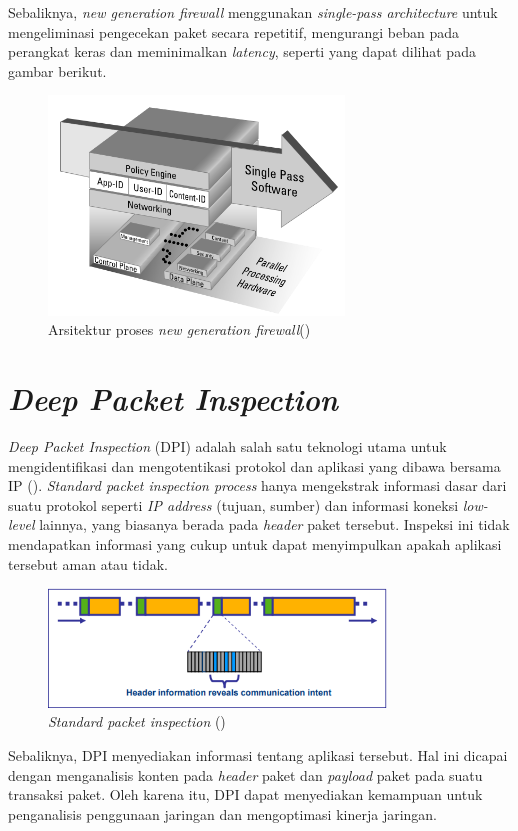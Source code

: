 Sebaliknya, \textit{new generation firewall} menggunakan \textit{single-pass architecture} untuk mengeliminasi pengecekan paket secara repetitif, mengurangi beban pada perangkat keras dan meminimalkan \textit{latency}, seperti yang dapat dilihat pada gambar berikut.

\begin{figure}[H]
	\centering
	\includegraphics[width=0.7\textwidth]{resources/architecture_NGFW.png}
	\caption{Arsitektur proses \textit{new generation firewall}(\cite{miller2011next})}
	\label{fig:architecture_NGFW}
\end{figure}

\section{\textit{Deep Packet Inspection}}
\textit{Deep Packet Inspection} (DPI) adalah salah satu teknologi utama untuk mengidentifikasi dan mengotentikasi protokol dan aplikasi yang dibawa bersama IP (\cite{allot2007digging}). \textit{Standard packet inspection process} hanya mengekstrak informasi dasar dari suatu protokol seperti \textit{IP address} (tujuan, sumber) dan informasi koneksi \textit{low-level} lainnya, yang biasanya berada pada \textit{header} paket tersebut. Inspeksi ini tidak mendapatkan informasi yang cukup untuk dapat menyimpulkan apakah aplikasi tersebut aman atau tidak. 
\begin{figure}[H]
	\centering
	\includegraphics[width=0.8\textwidth]{resources/standard_inspection.png}
	\caption{\textit{Standard packet inspection} (\cite{allot2007digging})}
	\label{fig:standard_inspection}
\end{figure}
Sebaliknya, DPI menyediakan informasi tentang aplikasi tersebut. Hal ini dicapai dengan menganalisis konten pada \textit{header} paket dan \textit{payload} paket pada suatu transaksi paket. Oleh karena itu, DPI dapat menyediakan kemampuan untuk penganalisis penggunaan jaringan dan mengoptimasi kinerja jaringan. 

